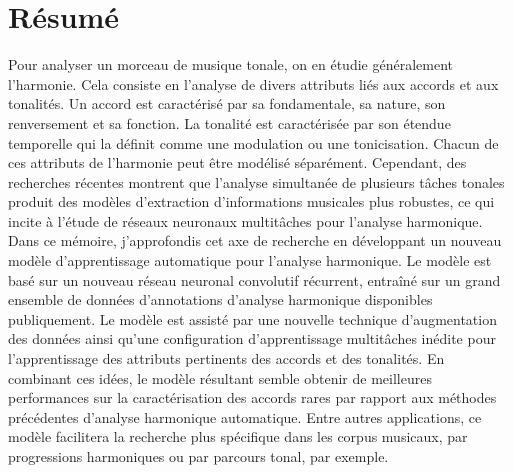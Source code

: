 \chapter*{R\'esum\'e}
\label{chap:abstract-fr}

Pour analyser un morceau de musique tonale, on en étudie
généralement l'harmonie. Cela consiste en l'analyse de
divers attributs liés aux accords et aux tonalités. Un
accord est caractérisé par sa fondamentale, sa nature, son
renversement et sa fonction. La tonalité est caractérisée
par son étendue temporelle qui la définit comme une
modulation ou une tonicisation. Chacun de ces attributs de
l'harmonie peut être modélisé séparément. Cependant, des
recherches récentes montrent que l'analyse simultanée de
plusieurs tâches tonales produit des modèles d'extraction
d'informations musicales plus robustes, ce qui incite à
l'étude de réseaux neuronaux multitâches pour l'analyse
harmonique. Dans ce mémoire, j'approfondis cet axe de
recherche en développant un nouveau modèle d'apprentissage
automatique pour l'analyse harmonique. Le modèle est basé
sur un nouveau réseau neuronal convolutif récurrent,
entraîné sur un grand ensemble de données d'annotations
d'analyse harmonique disponibles publiquement. Le modèle est
assisté par une nouvelle technique d'augmentation des
données ainsi qu'une configuration d'apprentissage
multitâches inédite pour l'apprentissage des attributs
pertinents des accords et des tonalités. En combinant ces
idées, le modèle résultant semble obtenir de meilleures
performances sur la caractérisation des accords rares par
rapport aux méthodes précédentes d'analyse harmonique
automatique. Entre autres applications, ce modèle facilitera
la recherche plus spécifique dans les corpus musicaux, par
progressions harmoniques ou par parcours tonal, par exemple.

